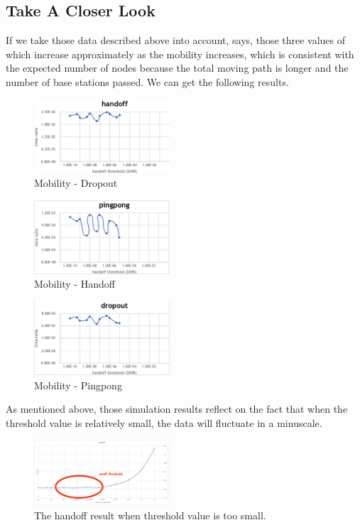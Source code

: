 \documentclass[a4paper]{IEEEtran}
\begin{document}
\subsection{Take A Closer Look}
If we take those data described above into account, says, those three values ​​of which increase approximately as the mobility increases, which is consistent with the expected number of nodes because the total moving path is longer and the number of base stations passed. We can get the following results.
\begin{figure}[h]
    \includegraphics[width=0.45\textwidth]{small/dropout}
    \caption{Mobility - Dropout}
    \label{fig:mesh7}
\end{figure}
\begin{figure}[h]
        \includegraphics[width=0.45\textwidth]{small/handoff}
    \caption{Mobility - Handoff}
    \label{fig:mesh8}
\end{figure}
\begin{figure}[h]
    \includegraphics[width=0.45\textwidth]{small/pingpong}
    \caption{Mobility - Pingpong}
    \label{fig:mesh9}
\end{figure}
As mentioned above, those simulation results reflect on the fact that when the threshold value is relatively small, the data will fluctuate in a minuscale.
\begin{figure}[h]
    \includegraphics[width=0.45\textwidth]{diagram/small-threshold}
    \caption{The handoff result when threshold value is too small.}
    \label{fig:mesh9}
\end{figure}
\end{document}
